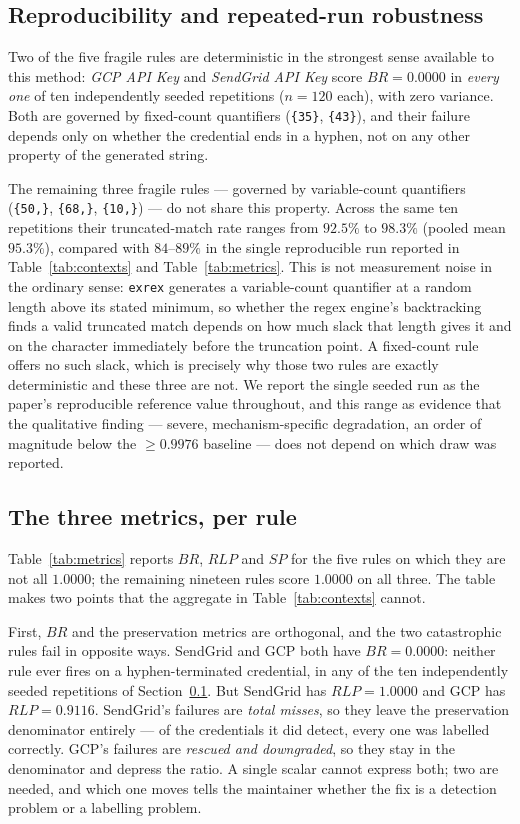 \documentclass[pdflatex,sn-basic]{sn-jnl}
\begin{document}
\subsection{Reproducibility and repeated-run robustness}
\label{sec:reprod-rq1}

Two of the five fragile rules are deterministic in the strongest sense available to this method: \emph{GCP API Key} and \emph{SendGrid API Key} score $BR=0.0000$ in \emph{every one} of ten independently seeded repetitions ($n=120$ each), with zero variance. Both are governed by fixed-count quantifiers (\texttt{\{35\}}, \texttt{\{43\}}), and their failure depends only on whether the credential ends in a hyphen, not on any other property of the generated string.

The remaining three fragile rules --- governed by variable-count quantifiers (\texttt{\{50,\}}, \texttt{\{68,\}}, \texttt{\{10,\}}) --- do not share this property. Across the same ten repetitions their truncated-match rate ranges from $92.5\%$ to $98.3\%$ (pooled mean $95.3\%$), compared with $84$--$89\%$ in the single reproducible run reported in Table~\ref{tab:contexts} and Table~\ref{tab:metrics}. This is not measurement noise in the ordinary sense: \texttt{exrex} generates a variable-count quantifier at a random length above its stated minimum, so whether the regex engine's backtracking finds a valid truncated match depends on how much slack that length gives it and on the character immediately before the truncation point. A fixed-count rule offers no such slack, which is precisely why those two rules are exactly deterministic and these three are not. We report the single seeded run as the paper's reproducible reference value throughout, and this range as evidence that the qualitative finding --- severe, mechanism-specific degradation, an order of magnitude below the $\geq 0.9976$ baseline --- does not depend on which draw was reported.

\subsection{The three metrics, per rule}

Table~\ref{tab:metrics} reports $BR$, $RLP$ and $SP$ for the five rules on which they are not all $1.0000$; the remaining nineteen rules score $1.0000$ on all three. The table makes two points that the aggregate in Table~\ref{tab:contexts} cannot.

First, $BR$ and the preservation metrics are orthogonal, and the two catastrophic rules fail in opposite ways. SendGrid and GCP both have $BR = 0.0000$: neither rule ever fires on a hyphen-terminated credential, in any of the ten independently seeded repetitions of Section~\ref{sec:reprod-rq1}. But SendGrid has $RLP = 1.0000$ and GCP has $RLP = 0.9116$. SendGrid's failures are \emph{total misses}, so they leave the preservation denominator entirely --- of the credentials it did detect, every one was labelled correctly. GCP's failures are \emph{rescued and downgraded}, so they stay in the denominator and depress the ratio. A single scalar cannot express both; two are needed, and which one moves tells the maintainer whether the fix is a detection problem or a labelling problem.
\end{document}
